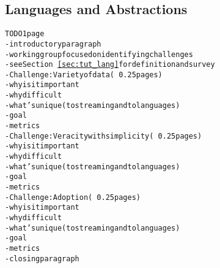 \subsection{Languages and Abstractions}\label{sec:wg_lang}

\begin{alltt}TODO\scriptsize 1 page
- introductory paragraph
  - working group focused on identifying challenges
  - see Section~\ref{sec:tut_lang} for definition and survey
- Challenge: Variety of data (~0.25 pages)
  - why is it important
  - why difficult
  - what's unique (to streaming and to languages)
  - goal
  - metrics
- Challenge: Veracity with simplicity (~0.25 pages)
  - why is it important
  - why difficult
  - what's unique (to streaming and to languages)
  - goal
  - metrics
- Challenge: Adoption (~0.25 pages)
  - why is it important
  - why difficult
  - what's unique (to streaming and to languages)
  - goal
  - metrics
- closing paragraph
\end{alltt}
